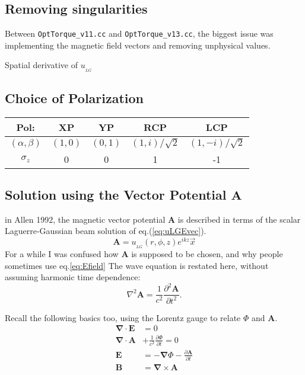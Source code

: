 \documentclass[11pt,letterpaper]{article}
\newcommand{\p}{\partial}
\newcommand{\del}{\boldsymbol\nabla}
\begin{document}
\subsection{Removing singularities}
Between \texttt{OptTorque\_v11.cc} and \texttt{OptTorque\_v13.cc}, the biggest issue was implementing the magnetic field vectors and removing unphysical values. 

Spatial derivative of $u_{_{LG}}$


\subsection{Choice of Polarization}
\begin{center}
\begin{tabular}{|c|c|c|c|c|}
\hline 
Pol: & XP & YP & RCP & LCP\\ 
\hline 
$(\alpha,\beta)$ & $(1,0)$ & $(0,1)$ & $(1,i)/\sqrt{2}$ & $(1,-i)/\sqrt{2}$\\ 
\hline 
$\sigma_z$ & 0 & 0 & 1 & -1 \\ 
\hline 
\end{tabular} 

\end{center}

\clearpage



\subsection{Solution using the Vector Potential $\mathbf{A}$}
in Allen 1992, the magnetic vector potential $\mathbf{A}$ is described in terms of the scalar Laguerre-Gaussian beam solution of eq.(\ref{eq:uLGEvec}). 
\begin{equation}\label{eq:A}
\mathbf{A}= u_{_{LG}}(r,\phi,z)e^{ikz}\vec{x}
\end{equation}
For a while I was confused how $\mathbf{A}$ is supposed to be chosen, and why people sometimes use eq.\ref{eq:Efield}
The wave equation is restated here, without assuming harmonic time dependence:
\begin{equation}\label{eq:waveA}
\nabla^2 \mathbf{A} = \frac{1}{c^2} \frac{\p^2 \mathbf{A}}{\p t^2}.
\end{equation}

Recall the following basics too, using the Lorentz gauge to relate $\Phi$ and $\mathbf{A}$. 
\begin{align*}
\del\cdot\mathbf{E}&=0\\
\del\cdot\mathbf{A}&+\frac{1}{c^2}\frac{\p \Phi}{\p t}=0\\
\mathbf{E}&=-\del\Phi-\frac{\p \mathbf{A}}{\p t}\\
\mathbf{B}&=\del\times\mathbf{A}
\end{align*}
\end{document}

